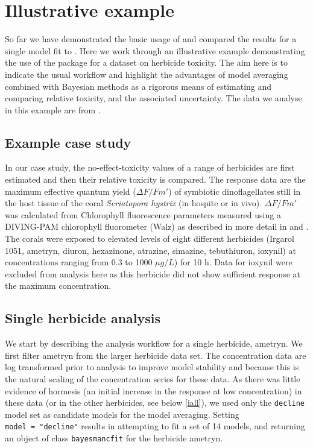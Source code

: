 \documentclass[
  shortnames]{jss}
\begin{document}
\section[Illustrative example]{Illustrative example}\label{iexample}

So far we have demonstrated the basic usage of  and compared the results for a single model fit to . Here we work through an illustrative example demonstrating the use of the package for a dataset on herbicide toxicity. The aim here is to indicate the usual workflow and highlight the advantages of model averaging combined with Bayesian methods as a rigorous means of estimating and comparing relative toxicity, and the associated uncertainty. The data we analyse in this example are from \citet{jones2003meps}.

\hypertarget{example-case-study}{%
\subsection{Example case study}\label{example-case-study}}

In our case study, the no-effect-toxicity values of a range of herbicides are first estimated and then their relative toxicity is compared. The response data are the maximum effective quantum yield (\({\Delta F / Fm'}\)) of symbiotic dinoflagellates still in the host tissue of the coral \emph{Seriatopora hystrix} (in hospite or in vivo). \({\Delta F / Fm'}\) was calculated from Chlorophyll fluorescence parameters measured using a DIVING-PAM chlorophyll fluorometer (Walz) as described in more detail in \citet{jones2003meps} and \citet{jones2003effects}. The corals were exposed to elevated levels of eight different herbicides (Irgarol 1051, ametryn, diuron, hexazinone, atrazine, simazine, tebuthiuron, ioxynil) at concentrations ranging from 0.3 to 1000 \({\mu g/L}\)) for 10 h. Data for ioxynil were excluded from analysis here as this herbicide did not show sufficient response at the maximum concentration.

\subsection[Single herbicide]{Single herbicide analysis}\label{isingle}

We start by describing the analysis workflow for a single herbicide, ametryn. We first filter ametryn from the larger herbicide data set. The concentration data are log transformed prior to analysis to improve model stability and because this is the natural scaling of the concentration series for these data. As there was little evidence of hormesis (an initial increase in the response at low concentration) in these data (or in the other herbicides, see below \ref{iall}), we used only the \texttt{decline} model set as candidate models for the model averaging. Setting \texttt{model\ =\ "decline"} results in  attempting to fit a set of 14 models, and returning an object of class \texttt{bayesmancfit} for the herbicide ametryn.
\end{document}
